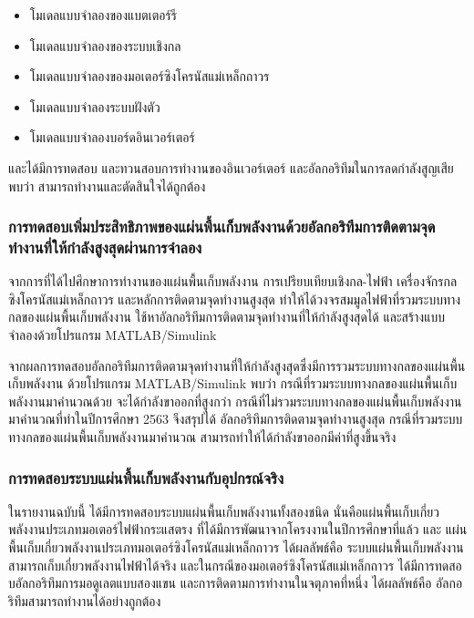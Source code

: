\documentclass[11pt,a4paper]{article}
\begin{document}
\begin{itemize}
    \item โมเดลแบบจำลองของแบตเตอร์รี
    \item โมเดลแบบจำลองของระบบเชิงกล
    \item โมเดลแบบจำลองของมอเตอร์ซิงโครนัสแม่เหล็กถาวร
    \item โมเดลแบบจำลองระบบฝังตัว
    \item โมเดลแบบจำลองบอร์ดอินเวอร์เตอร์
\end{itemize}

และได้มีการทดสอบ และทวนสอบการทำงานของอินเวอร์เตอร์ และอัลกอริทึมในการลดกำลังสูญเสีย พบว่า สามารถทำงานและตัดสินใจได้ถูกต้อง

\subsubsection{การทดสอบเพิ่มประสิทธิภาพของแผ่นพื้นเก็บพลังงานด้วยอัลกอริทึมการติดตามจุดทำงานที่ให้กำลังสูงสุดผ่านการจำลอง}
จากการที่ได้ไปศึกษาการทำงานของแผ่นพื้นเก็บพลังงาน การเปรียบเทียบเชิงกล-ไฟฟ้า เครื่องจักรกลซิงโครนัสแม่เหล็กถาวร และหลักการติดตามจุดทำงานสูงสุด
ทำให้ได้วงจรสมมูลไฟฟ้าที่รวมระบบทางกลของแผ่นพื้นเก็บพลังงาน ใช้หาอัลกอริทึมการติดตามจุดทำงานที่ให้กำลังสูงสุดได้ และสร้างแบบจำลองด้วยโปรแกรม MATLAB/Simulink

จากผลการทดสอบอัลกอริทึมการติดตามจุดทำงานที่ให้กำลังสูงสุดซึ่งมีการรวมระบบทางกลของแผ่นพื้นเก็บพลังงาน ด้วยโปรแกรม MATLAB/Simulink
พบว่า กรณีที่รวมระบบทางกลของแผ่นพื้นเก็บพลังงานมาคำนวณด้วย จะได้กำลังขาออกที่สูงกว่า กรณีที่ไม่รวมระบบทางกลของแผ่นพื้นเก็บพลังงานมาคำนวณที่ทำในปีการศึกษา 2563
จึงสรุปได้ อัลกอริทึมการติดตามจุดทำงานสูงสุด กรณีที่รวมระบบทางกลของแผ่นพื้นเก็บพลังงานมาคำนวณ สามารถทำให้ได้กำลังขาออกมีค่าที่สูงขึ้นจริง

\subsubsection{การทดสอบระบบแผ่นพื้นเก็บพลังงานกับอุปกรณ์จริง}
ในรายงานฉบับนี้ ได้มีการทดสอบระบบแผ่นพื้นเก็บพลังงานทั้งสองชนิด นั่นคือแผ่นพื้นเก็บเกี่ยวพลังงานประเภทมอเตอร์ไฟฟ้ากระแสตรง ที่ได้มีการพัฒนาจากโครงงานในปีการศึกษาที่แล้ว และ แผ่นพื้นเก็บเกี่ยวพลังงานประเภทมอเตอร์ซิงโครนัสแม่เหล็กถาวร ได้ผลลัพธ์คือ ระบบแผ่นพื้นเก็บพลังงาน สามารถเก็บเกี่ยวพลังงานไฟฟ้าได้จริง และในกรณีของมอเตอร์ซิงโครนัสแม่เหล็กถาวร ได้มีการทดสอบอัลกอริทึมการมอดูเลตแบบสองแขน และการติดตามการทำงานในจตุภาคที่หนึ่ง ได้ผลลัพธ์คือ อัลกอริทึมสามารถทำงานได้อย่างถูกต้อง
\end{document}
